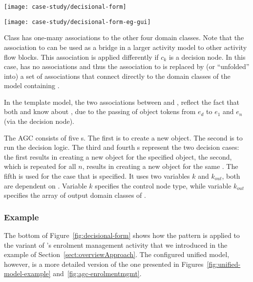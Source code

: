 \begin{figure*}[ht]
\begin{center}
\texttt{[image: case-study/decisional-form]}
\end{center}
\caption{The decisional pattern form.} %
\label{fig:decisional-form}
\end{figure*}
%
\begin{figure*}[ht]
\begin{center}
\texttt{[image: case-study/decisional-form-eg-gui]}
\end{center}
\caption{The decisional pattern form view of enrolment management.} %
\label{fig:decisional-form-eg-gui}
\end{figure*}

Class  has one-many associations to the other four domain classes. 
Note that the association to  can be used as a bridge in a larger activity model to other activity flow blocks. This association is applied differently if $ c_k $ is a decision node. In this case,  has no associations and thus the association to  is replaced by (or ``unfolded'' into) a set of associations that connect  directly to the domain classes of the model containing .

In the template model, the two associations between  and ,  reflect the fact that both  and  know about , due to the passing of object tokens from $ e_d $ to $ e_1 $ and $ e_n $ (via the decision node).

The AGC consists of five s. The first  is to create a new  object. The second  is to run the decision logic. The third and fourth s represent the two decision cases: the first results in creating a new  object for the specified  object, the second, which is repeated for all $ n $, results in creating a new  object for the same . The fifth  is used for the case that  is specified. It uses two variables $ k $ and $ k_{out} $, both are dependent on . Variable $ k $ specifies the control node type, while variable $ k_{out} $ specifies the array of output domain classes of .

\subsubsection*{Example}
The bottom of Figure~\ref{fig:decisional-form} shows how the pattern is applied to the variant of \courseman's enrolment management activity that we introduced in the example of Section~\ref{sect:overviewApproach}. The configured unified model, however, is a more detailed version of the one presented in Figures~\ref{fig:unified-model-example} and~\ref{fig:agc-enrolmentmgmt}. 

